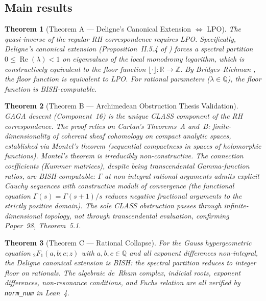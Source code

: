 \documentclass[11pt,a4paper]{article}
\theoremstyle{plain}
\newtheorem{theorem}{Theorem}[section]
\theoremstyle{definition}
\newcommand{\BISH}{\textsf{BISH}}
\newcommand{\LPO}{\textsf{LPO}}
\newcommand{\CLASS}{\textsf{CLASS}}
\newcommand{\Z}{\mathbb{Z}}
\newcommand{\Q}{\mathbb{Q}}
\newcommand{\R}{\mathbb{R}}
\renewcommand{\Re}{\operatorname{Re}}
\begin{document}
\subsection{Main results}

\begin{theorem}[Theorem A --- Deligne's Canonical Extension $\Leftrightarrow$ \LPO]
The quasi-inverse of the regular RH correspondence requires \LPO.
Specifically, Deligne's canonical extension (Proposition~II.5.4 of \cite{Deligne1970}) forces a spectral partition $0 \le \Re(\lambda) < 1$ on eigenvalues of the local monodromy logarithm, which is constructively equivalent to the floor function $\lfloor \cdot \rfloor : \R \to \Z$.
By Bridges--Richman \cite{BridgesRichman1987}, the floor function is equivalent to \LPO.
For rational parameters ($\lambda \in \Q$), the floor function is \BISH-computable.
\end{theorem}

\begin{theorem}[Theorem B --- Archimedean Obstruction Thesis Validation]
GAGA descent (Component~16) is the \emph{unique} \CLASS{} component of the RH correspondence.
The proof relies on Cartan's Theorems~A and~B: finite-dimensionality of coherent sheaf cohomology on compact analytic spaces, established via Montel's theorem (sequential compactness in spaces of holomorphic functions).
Montel's theorem is irreducibly non-constructive.
The connection coefficients (Kummer matrices), despite being transcendental Gamma-function ratios, are \BISH-computable: $\Gamma$ at non-integral rational arguments admits explicit Cauchy sequences with constructive moduli of convergence (the functional equation $\Gamma(s) = \Gamma(s{+}1)/s$ reduces negative fractional arguments to the strictly positive domain).
The sole \CLASS{} obstruction passes through infinite-dimensional topology, not through transcendental evaluation, confirming Paper~98, Theorem~5.1.
\end{theorem}

\begin{theorem}[Theorem C --- Rational Collapse]
For the Gauss hypergeometric equation ${}_2F_1(a,b;c;z)$ with $a,b,c \in \Q$ and all exponent differences non-integral, the Deligne canonical extension is \BISH: the spectral partition reduces to integer floor on rationals.
The algebraic de~Rham complex, indicial roots, exponent differences, non-resonance conditions, and Fuchs relation are all verified by \texttt{norm\_num} in Lean~4.
\end{theorem}
\end{document}
